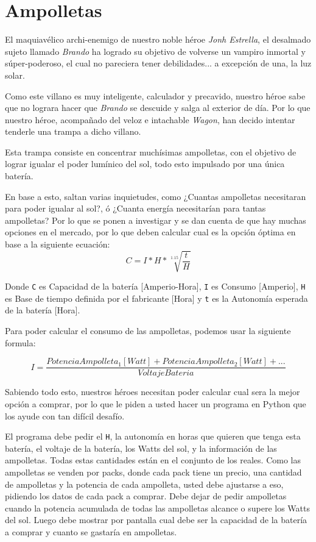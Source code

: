\documentclass[spanish]{scrartcl}
\begin{document}
\section{Ampolletas}

El maquiavélico archi-enemigo de nuestro noble héroe \textit{Jonh Estrella}, el desalmado sujeto llamado \textit{Brando} ha logrado su objetivo de volverse un vampiro inmortal y súper-poderoso, el cual no pareciera tener debilidades... a excepción de una, la luz solar.

Como este villano es muy inteligente, calculador y precavido, nuestro héroe sabe que no lograra hacer que \textit{Brando} se descuide y salga al exterior de día. Por lo que nuestro héroe, acompañado del veloz e intachable \textit{Wagon}, han decido intentar tenderle una trampa a dicho villano.

Esta trampa consiste en concentrar muchísimas ampolletas, con el objetivo de lograr igualar el poder lumínico del sol, todo esto impulsado por una única batería.

En base a esto, saltan varias inquietudes, como ¿Cuantas ampolletas necesitaran para poder igualar al sol?, ó ¿Cuanta energía necesitarían para tantas ampolletas? Por lo que se ponen a investigar y se dan cuenta de que hay muchas opciones en el mercado, por lo que deben calcular cual es la opción óptima en base a la siguiente ecuación:
\begin{equation*}
    C = I*H*\sqrt[1.15]{\frac{t}{H}}
\end{equation*}

Donde \texttt{C} es Capacidad de la batería [Amperio-Hora], \texttt{I} es Consumo [Amperio], \texttt{H} es Base de tiempo definida por el fabricante [Hora] y \texttt{t} es la Autonomía esperada de la batería [Hora].

Para poder calcular el consumo de las ampolletas, podemos usar la siguiente formula:

\begin{equation*}
    I = \frac{PotenciaAmpolleta_{1}[Watt] + PotenciaAmpolleta_{2}[Watt] + ...}{VoltajeBateria}
\end{equation*}

Sabiendo todo esto, nuestros héroes necesitan poder calcular cual sera la mejor opción a comprar, por lo que le piden a usted hacer un programa en Python que los ayude con tan difícil desafío.

El programa debe pedir el \texttt{H}, la autonomía en horas que quieren que tenga esta batería, el voltaje de la batería, los Watts del sol, y la información de las ampolletas. Todas estas cantidades están en el conjunto de los reales.
Como las ampolletas se venden por packs, donde cada pack tiene un precio, una cantidad de ampolletas y la potencia de cada ampolleta, usted debe ajustarse a eso, pidiendo los datos de cada pack a comprar. Debe dejar de pedir ampolletas cuando la potencia acumulada de todas las ampolletas alcance o supere los Watts del sol. 
Luego debe mostrar por pantalla cual debe ser la capacidad de la batería a comprar y cuanto se gastaría en ampolletas.
\end{document}
